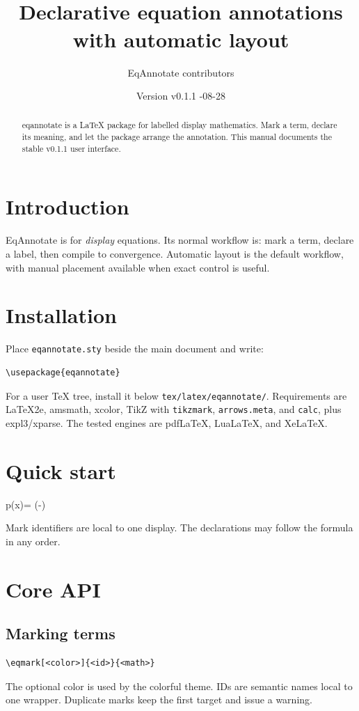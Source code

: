 \documentclass[11pt]{article}
\title{\pkg\\\large Declarative equation annotations with automatic layout}
\author{EqAnnotate contributors}
\date{Version v0.1.1 \quad 2026-08-28}
\newcommand{\pkg}{\textsf{eqannotate}}
\begin{document}
\maketitle
\begin{abstract}
\pkg{} is a LaTeX package for labelled display mathematics. Mark a term,
declare its meaning, and let the package arrange the annotation. This manual
documents the stable v0.1.1 user interface.
\end{abstract}
\tableofcontents

\section{Introduction}
EqAnnotate is for \emph{display} equations. Its normal workflow is: mark a
term, declare a label, then compile to convergence. Automatic layout is the
default workflow, with manual placement available when exact control is useful.

\section{Installation}
Place \texttt{eqannotate.sty} beside the main document and write:
\begin{verbatim}
\usepackage{eqannotate}
\end{verbatim}
For a user TeX tree, install it below \texttt{tex/latex/eqannotate/}.
Requirements are LaTeX2e, \textsf{amsmath}, \textsf{xcolor}, TikZ with
\texttt{tikzmark}, \texttt{arrows.meta}, and \texttt{calc}, plus
\textsf{expl3}/\textsf{xparse}. The tested engines are pdfLaTeX, LuaLaTeX,
and XeLaTeX.

\section{Quick start}
\begin{annotatedequation}
p(x)=
\exp\left(-\right)

\end{annotatedequation}
Mark identifiers are local to one display. The declarations may follow the
formula in any order.

\section{Core API}
\subsection{Marking terms}
\begin{verbatim}
\eqmark[<color>]{<id>}{<math>}
\end{verbatim}
The optional color is used by the colorful theme. IDs are semantic names local
to one wrapper. Duplicate marks keep the first target and issue a warning.
\end{document}
